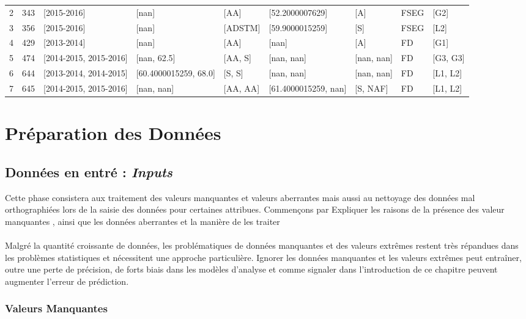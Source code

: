 \begin{table}
\begin{tabular}{lrlllllll}
	2 &  343 &             [2015-2016] &                  [nan] &      [AA] &       [52.2000007629] &         [A] &  FSEG &      [G2] \\
	3 &  356 &             [2015-2016] &                  [nan] &   [ADSTM] &       [59.9000015259] &         [S] &  FSEG &      [L2] \\
	4 &  429 &             [2013-2014] &                  [nan] &      [AA] &                 [nan] &         [A] &    FD &      [G1] \\
	5 &  474 &  [2014-2015, 2015-2016] &            [nan, 62.5] &   [AA, S] &            [nan, nan] &  [nan, nan] &    FD &  [G3, G3] \\
	6 &  644 &  [2013-2014, 2014-2015] &  [60.4000015259, 68.0] &    [S, S] &            [nan, nan] &  [nan, nan] &    FD &  [L1, L2] \\
	7 &  645 &  [2014-2015, 2015-2016] &             [nan, nan] &  [AA, AA] &  [61.4000015259, nan] &    [S, NAF] &    FD &  [L1, L2] \\
	\bottomrule
\end{tabular}
\endgroup
\end{table}
\section{Préparation des Données}
 \subsection{Données en entré  : \emph{Inputs}}
Cette phase consistera aux traitement des valeurs manquantes et valeurs aberrantes mais aussi au nettoyage des données mal orthographiées lors de la saisie des données pour certaines attribues. 
Commençons par  Expliquer les raisons de la présence des valeur manquantes , ainsi que les données aberrantes et la manière de les traiter
\paragraph{}
Malgré la quantité croissante de données, les problématiques de données
manquantes et des valeurs extrêmes restent très répandues dans les
problèmes statistiques et nécessitent une approche particulière. Ignorer
les données manquantes et les valeurs extrêmes peut entraîner, outre une
perte de précision, de forts biais dans les modèles d'analyse et comme
signaler dans l'introduction de ce chapitre peuvent augmenter l'erreur
de prédiction.
\subsubsection{Valeurs Manquantes}
